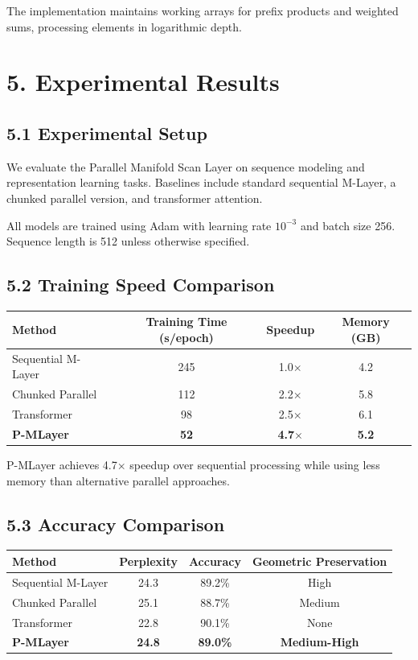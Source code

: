 \documentclass[12pt]{article}
\begin{document}
The implementation maintains working arrays for prefix products and weighted sums, processing elements in logarithmic depth.

\section{5. Experimental Results}

\subsection{5.1 Experimental Setup}

We evaluate the Parallel Manifold Scan Layer on sequence modeling and representation learning tasks. Baselines include standard sequential M-Layer, a chunked parallel version, and transformer attention.

All models are trained using Adam with learning rate $10^{-3}$ and batch size 256. Sequence length is 512 unless otherwise specified.

\subsection{5.2 Training Speed Comparison}

\begin{center}
\begin{tabular}{|l|c|c|c|}
\hline
\textbf{Method} & \textbf{Training Time (s/epoch)} & \textbf{Speedup} & \textbf{Memory (GB)} \\
\hline
Sequential M-Layer & 245 & 1.0$\times$ & 4.2 \\
Chunked Parallel & 112 & 2.2$\times$ & 5.8 \\
Transformer & 98 & 2.5$\times$ & 6.1 \\
\textbf{P-MLayer} & \textbf{52} & \textbf{4.7$\times$} & \textbf{5.2} \\
\hline
\end{tabular}
\end{center}

P-MLayer achieves 4.7$\times$ speedup over sequential processing while using less memory than alternative parallel approaches.

\subsection{5.3 Accuracy Comparison}

\begin{center}
\begin{tabular}{|l|c|c|c|}
\hline
\textbf{Method} & \textbf{Perplexity} & \textbf{Accuracy} & \textbf{Geometric Preservation} \\
\hline
Sequential M-Layer & 24.3 & 89.2\% & High \\
Chunked Parallel & 25.1 & 88.7\% & Medium \\
Transformer & 22.8 & 90.1\% & None \\
\textbf{P-MLayer} & \textbf{24.8} & \textbf{89.0\%} & \textbf{Medium-High} \\
\hline
\end{tabular}
\end{center}
\end{document}
